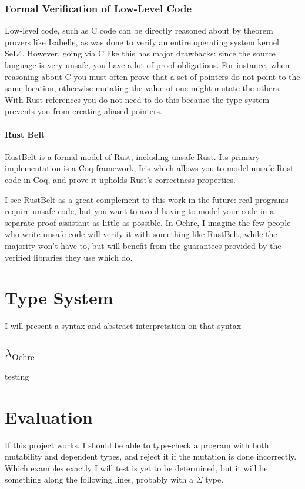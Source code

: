 \documentclass[12pt,twoside]{report}
\newcommand{\lochre}{$\lambda_\text{Ochre}$}
\begin{document}
\subsection{Formal Verification of Low-Level Code}
Low-level code, such as C code can be directly reasoned about by theorem provers like Isabelle, as was done to verify an entire operating system kernel SeL4\cite{klein_sel4_2009}. However, going via C like this has major drawbacks: since the source language is very unsafe, you have a lot of proof obligations. For instance, when reasoning about C you must often prove that a set of pointers do not point to the same location, otherwise mutating the value of one might mutate the others. With Rust references you do not need to do this because the type system prevents you from creating aliased pointers.

\subsubsection{Rust Belt}
RustBelt\cite{jung_rustbelt_2018} is a formal model of Rust, including unsafe Rust. Its primary implementation is a Coq framework, Iris\cite{noauthor_iris_nodate} which allows you to model unsafe Rust code in Coq, and prove it upholds Rust's correctness properties.

I see RustBelt as a great complement to this work in the future: real programs require unsafe code, but you want to avoid having to model your code in a separate proof assistant as little as possible. In Ochre, I imagine the few people who write unsafe code will verify it with something like RustBelt, while the majority won't have to, but will benefit from the guarantees provided by the verified libraries they use which do.

\chapter{Type System}
I will present a syntax and abstract interpretation on that syntax

\section{\lochre}
testing


\chapter{Evaluation}
If this project works, I should be able to type-check a program with both mutability and dependent types, and reject it if the mutation is done incorrectly. Which examples exactly I will test is yet to be determined, but it will be something along the following lines, probably with a $\Sigma$ type.
\end{document}
